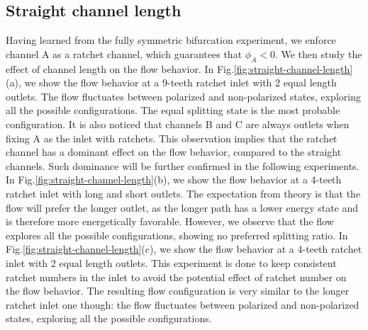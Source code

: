 \documentclass[%
10pt,
superscriptaddress,
twocolumn,
 amsmath,amssymb,
 aps,prx,
]{revtex4-2}
\begin{document}
\subsection{Straight channel length}

Having learned from the fully symmetric bifurcation experiment, we enforce channel A as a ratchet channel, which guarantees that $\phi_A<0$.
We then study the effect of channel length on the flow behavior.
In Fig.\ref{fig:straight-channel-length}(a), we show the flow behavior at a 9-teeth ratchet inlet with 2 equal length outlets.
The flow fluctuates between polarized and non-polarized states, exploring all the possible configurations.
The equal splitting state is the most probable configuration.
It is also noticed that channels B and C are always outlets when fixing A as the inlet with ratchets.
This observation implies that the ratchet channel has a dominant effect on the flow behavior, compared to the straight channels.
Such dominance will be further confirmed in the following experiments.
In Fig.\ref{fig:straight-channel-length}(b), we show the flow behavior at a 4-teeth ratchet inlet with long and short outlets.
The expectation from theory is that the flow will prefer the longer outlet, as the longer path has a lower energy state and is therefore more energetically favorable.
However, we observe that the flow explores all the possible configurations, showing no preferred splitting ratio.
In Fig.\ref{fig:straight-channel-length}(c), we show the flow behavior at a 4-teeth ratchet inlet with 2 equal length outlets.
This experiment is done to keep consistent ratchet numbers in the inlet to avoid the potential effect of ratchet number on the flow behavior.
The resulting flow configuration is very similar to the longer ratchet inlet one though: the flow fluctuates between polarized and non-polarized states, exploring all the possible configurations.
\end{document}
